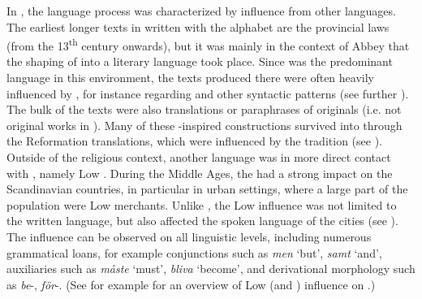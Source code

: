 \documentclass[output=paper]{langscibook}
\begin{document}
In , the language  process was characterized by influence from other languages. The earliest longer texts in  written with the  alphabet are the provincial laws (from the 13\textsuperscript{th} century onwards), but it was mainly in the context of  Abbey that the shaping of  into a literary language took place. Since  was the predominant language in this environment, the  texts produced there were often heavily influenced by , for instance regarding  and other syntactic patterns (see further \citealt{Hoder2009, Hoder2010, Wollin1981, Wollin1983}). The bulk of the texts were also translations or paraphrases of  originals (i.e. not original works in ). Many of these -inspired constructions survived into  through the Reformation  translations, which were influenced by the  tradition (see \citealt{Stahle1970, Teleman2002, Teleman2003Swedish}). Outside of the religious context, another language was in more direct contact with , namely Low . During the Middle Ages, the  had a strong impact on the Scandinavian countries, in particular in urban settings, where a large part of the population were Low  merchants. Unlike , the Low  influence was not limited to the written language, but also affected the spoken language of the cities (see \citealt{Braunmuller1997,Braunmuller2005,}). The influence can be observed on all linguistic levels, including numerous grammatical loans, for example conjunctions such as \textit{men} ‘but’, \textit{samt} ‘and’, auxiliaries such as \textit{måste} ‘must’, \textit{bliva} ‘become’, and derivational morphology such as \textit{be}{}-, \textit{för}{}-. (See for example \citealt{Braunmuller2005} for an overview of Low  (and ) influence on .)
\end{document}
